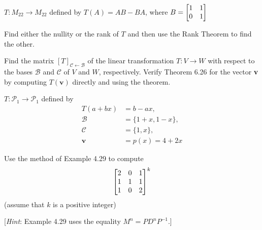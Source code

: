 \documentclass[boxes]{gsypset}
\begin{document}
\begin{problem}[6.5.12]
	$T:M_{22}\to M_{22}$ defined by $T(A)=AB-BA$, where $B=\begin{bmatrix}1&1\\0&1\end{bmatrix}$
	
	Find either the nullity or the rank of $T$ and
	then use the Rank Theorem to find the other.
\end{problem}
\begin{solution}
	
\end{solution}

\begin{problem}[6.6.2]
	
	Find the matrix $[T]_{\mathcal{C}\leftarrow\mathcal{B}}$
	of the linear transformation $T:V\to W$ with respect to the bases 
	$\mathcal{B}$ and $\mathcal{C}$ of $V$ and $W$, respectively. 
	Verify Theorem 6.26 for the vector \textbf{v} by 
	computing $T(\textbf{v})$ directly and using the theorem.
	
	$T: \mathscr{P}_1 \to \mathscr{P}_1$ defined by
	\begin{align*}
		T(a+bx) &= b-ax, \\
		\mathcal{B} &= \{1+x,1-x\}, \\
		\mathcal{C} &= \{1,x\}, \\
		\textbf{v} &= p(x)=4+2x
	\end{align*}
\end{problem}
\begin{solution}
	
\end{solution}

\begin{problem}[4.4.22]
	Use the method of Example 4.29 to compute
	\[
		\begin{bmatrix}2&0&1\\1&1&1\\1&0&2\end{bmatrix}^k
	\]
	(assume that $k$ is a positive integer)
	
	[\textit{Hint}: Example 4.29 uses the equality $M^n = PD^nP^{-1}$.]
\end{problem}
\begin{solution}
	
\end{solution}
\end{document}
